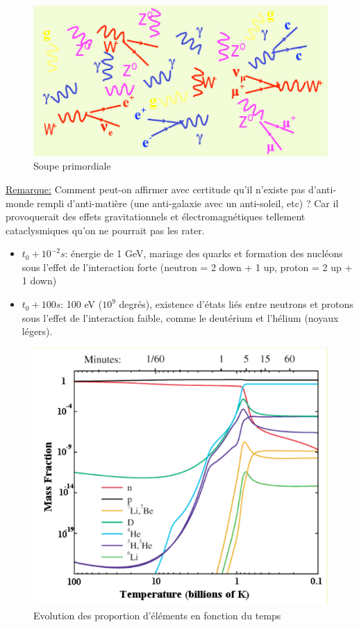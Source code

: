 \begin{figure}[ht]
    \centering
    \includegraphics[scale=0.65]{Images1/soupe.png}
    \caption{Soupe primordiale}
    \label{fig:soupe_promordiale}
\end{figure}

\underline{Remarque:} Comment peut-on affirmer avec certitude qu'il n'existe pas d'anti-monde rempli d'anti-matière (une anti-galaxie avec un anti-soleil, etc) ? Car il provoquerait des effets gravitationnels et électromagnétiques tellement cataclysmiques qu'on ne pourrait pas les rater.

\begin{itemize}
    \item $t_0 + 10^{-2}s$: énergie de 1 GeV, mariage des quarks et formation des nucléons sous l'effet de l'interaction forte (neutron = 2 down + 1 up, proton = 2 up + 1 down)
    \item $t_0+100s$: 100 eV ($10^9$ degrés), existence d'états liés entre neutrons et protons sous l'effet de l'interaction faible, comme le deutérium et l'hélium (noyaux légers).
\end{itemize}

\begin{figure}[ht]
    \centering
    \includegraphics[scale=0.50]{Images1/tempmass.png}
    \caption{Evolution des proportion d'éléments en fonction du temps}
\end{figure}

